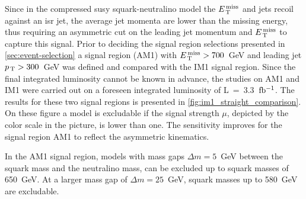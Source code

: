 Since in the compressed \gls{susy} squark-neutralino model the $E_\mathrm{\, T}^\mathrm{\, miss}$ and jets
recoil against an \gls{isr} jet, the average jet momenta are lower than the
missing energy, thus requiring an asymmetric cut on the leading jet momentum and
$E_\mathrm{\, T}^\mathrm{\, miss}$ to capture this signal. Prior to deciding the signal region selections
presented in \cref{sec:event-selection} a signal region (AM1) with
$E_\mathrm{\, T}^\mathrm{\, miss} > 700$~GeV and leading jet $p_\mathrm{\, T} > 300$~GeV was defined and compared with
the IM1 signal region. Since the final integrated luminosity cannot be known in
advance, the studies on AM1 and IM1 were carried out on a foreseen integrated
luminosity of L~=~3.3~$\mbox{fb$^{-1}$}$. The results for these two signal regions is
presented in \cref{fig:im1_straight_comparison}. On these figure a model is
excludable if the signal strength $\mu$, depicted by the color scale in the
picture, is lower than one. The sensitivity improves for the signal region AM1
to reflect the asymmetric kinematics.

In the AM1 signal region, models with mass gaps $\Delta m = 5$~GeV between the
squark mass and the neutralino mass, can be excluded up to squark masses of
650~GeV. At a larger mass gap of $\Delta m = 25$~GeV, squark masses up to
580~GeV are excludable.

